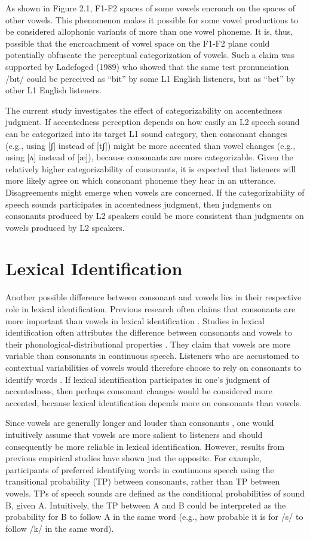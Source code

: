 As shown in Figure 2.1, F1-F2 spaces of some vowels encroach on the spaces of other vowels. This phenomenon makes it possible for some vowel productions to be considered allophonic variants of more than one vowel phoneme. It is, thus, possible that the encroachment of vowel space on the F1-F2 plane could potentially obfuscate the perceptual categorization of vowels. Such a claim was supported by Ladefoged (1989) who showed that the same test pronunciation /bɪt/ could be perceived as “bit” by some L1 English listeners, but as “bet” by other L1 English listeners.

The current study investigates the effect of categorizability on accentedness judgment.  If accentedness perception depends on how easily an L2 speech sound can be categorized into its target L1 sound category, then consonant changes (e.g., using [ʃ] instead of [tʃ]) might be more accented than vowel changes (e.g., using [ʌ] instead of [æ]), because consonants are more categorizable. Given the relatively higher categorizability of consonants, it is expected that listeners will more likely agree on which consonant phoneme they hear in an utterance. Disagreements might emerge when vowels are concerned. If the categorizability of speech sounds participates in accentedness judgment, then judgments on consonants produced by L2 speakers could be more consistent than judgments on vowels produced by L2 speakers.  

\section{Lexical Identification}

Another possible difference between consonant and vowels lies in their respective role in lexical identification. Previous research often claims that consonants are more important than vowels in lexical identification \citep{Nespor_2003}. Studies in lexical identification often attributes the difference between consonants and vowels to their phonological-distributional properties \citep{Nespor_2003}. They claim that vowels are more variable than consonants in continuous speech. Listeners who are accustomed to contextual variabilities of vowels would therefore choose to rely on consonants to identify words \citep{Cutler_2000}. If lexical identification participates in one’s judgment of accentedness, then perhaps consonant changes would be considered more accented, because lexical identification depends more on consonants than vowels. 

Since vowels are generally longer and louder than consonants \citep{Ladefoged_1996}, one would intuitively assume that vowels are more salient to listeners and should consequently be more reliable in lexical identification. However, results from previous empirical studies have shown just the opposite. For example, participants of \citep{Bonatti_2005} preferred identifying words in continuous speech using the transitional probability (TP) between consonants, rather than TP between vowels. TPs of speech sounds are defined as the conditional probabilities of sound B, given A. Intuitively, the TP between A and B could be interpreted as the probability for B to follow A in the same word (e.g., how probable it is for /s/ to follow /k/ in the same word). 

